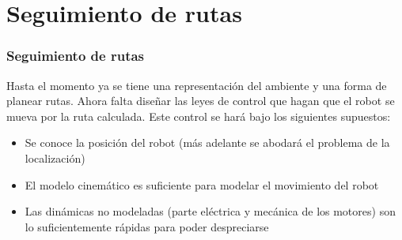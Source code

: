 \section{Seguimiento de rutas}
\begin{frame}\frametitle{Seguimiento de rutas}
  Hasta el momento ya se tiene una representación del ambiente y una forma de planear rutas. Ahora falta diseñar las leyes de control que hagan que el robot se mueva por la ruta calculada. Este control se hará bajo los siguientes supuestos:
  \begin{itemize}
  \item Se conoce la posición del robot (más adelante se abodará el problema de la localización)
  \item El modelo cinemático es suficiente para modelar el movimiento del robot 
  \item Las dinámicas no modeladas (parte eléctrica y mecánica de los motores) son lo suficientemente rápidas para poder despreciarse
  \end{itemize}
\end{frame}

